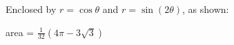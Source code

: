 {Enclosed by $r=\cos \theta$ and $r=\sin(2\theta)$, as shown:

\columnbreak
}
{area = $\frac{1}{32}(4\pi-3\sqrt{3})$
}

